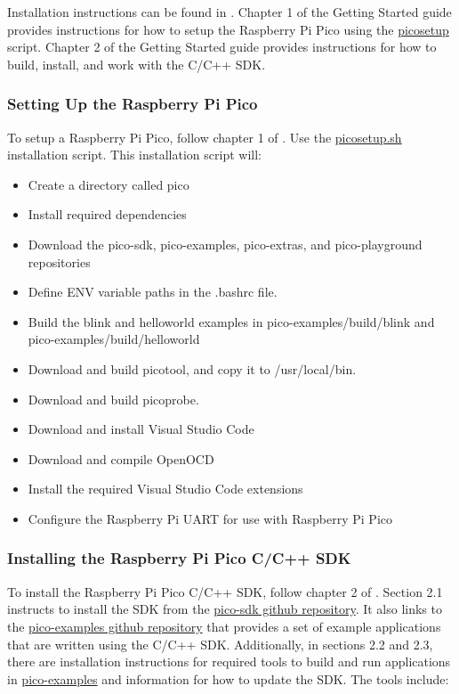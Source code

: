 {Installation instructions can be found in \citePicoGetStart. Chapter 1 of the Getting Started guide provides instructions for how to setup the Raspberry Pi Pico using the \href{https://raw.githubusercontent.com/raspberrypi/pico-setup/master/pico_setup.sh}{pico\textunderscore setup} script.
Chapter 2 of the Getting Started guide provides instructions for how to build, install, and work with the C/C++ SDK. 

\subsubsection{Setting Up the Raspberry Pi Pico}
To setup a Raspberry Pi Pico, follow chapter 1 of \citePicoGetStart. Use the \href{https://raw.githubusercontent.com/raspberrypi/pico-setup/master/pico_setup.sh}{pico\textunderscore setup.sh} installation script. 
This installation script will:
\begin{itemize}
    \item Create a directory called pico
    \item Install required dependencies
    \item Download the pico-sdk, pico-examples, pico-extras, and pico-playground repositories
    \item Define ENV variable paths in the .bashrc file.
    \item Build the blink and hello\textunderscore world examples in pico-examples/build/blink and pico-examples/build/hello\textunderscore world
    \item Download and build picotool, and copy it to /usr/local/bin.
    \item Download and build picoprobe.
    \item Download and install Visual Studio Code
    \item Download and compile OpenOCD
    \item Install the required Visual Studio Code extensions
    \item Configure the Raspberry Pi UART for use with Raspberry Pi Pico
\end{itemize}

\subsubsection{Installing the Raspberry Pi Pico C/C++ SDK}
To install the Raspberry Pi Pico C/C++ SDK, follow chapter 2 of \citePicoGetStart. Section 2.1 instructs to install the SDK from the \href{https://github.com/raspberrypi/pico-sdk}{pico-sdk github repository}.
It also links to the \href{https://github.com/raspberrypi/pico-examples}{pico-examples github repository} that provides a set of example applications that are written using the C/C++ SDK.
Additionally, in sections 2.2 and 2.3, there are installation instructions for required tools to build and run applications in \href{https://github.com/raspberrypi/pico-examples}{pico-examples} and information for how to update the SDK. The tools include:

}
